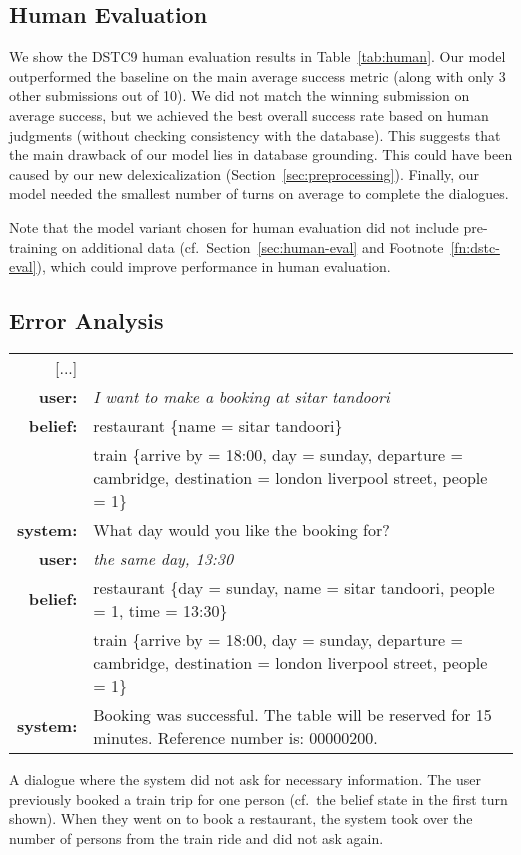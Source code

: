 \documentclass[11pt]{article}
\begin{document}
\subsection{Human Evaluation}

We show the DSTC9 human evaluation results in Table~\ref{tab:human}.
Our model outperformed the baseline on the main average success metric (along with only 3 other submissions out of 10).
We did not match the winning submission on average success, but we achieved the best overall success rate based on human judgments (without checking consistency with the database).
This suggests that the main drawback of our model lies in database grounding.
This could have been caused by our new delexicalization (Section~\ref{sec:preprocessing}).
Finally, our model needed the smallest number of turns on average to complete the dialogues.

Note that the model variant chosen for human evaluation did not include pre-training on additional data (cf.~Section~\ref{sec:human-eval} and Footnote~\ref{fn:dstc-eval}), which could improve performance in human evaluation.

\subsection{Error Analysis}\label{sec:quality-analysis}

\begin{example}[t]
\small
\setlength{\tabcolsep}{2pt}
\begin{mdframed}[style=ExampleFrame]
\begin{tabularx}{\textwidth}{rX}
[...] \\
\bf user: & \it I want to make a booking at sitar tandoori \\
\bf belief: & restaurant \{name = sitar tandoori\} \\
& train \{arrive by = 18:00, day = sunday, departure = cambridge, destination = london liverpool street, people = 1\} \\
\bf system: & What day would you like the booking for? \\
\bf user: & \it the same day, 13:30 \\
\bf belief: & restaurant \{day = sunday, name = sitar tandoori, people = 1, time = 13:30\} \\
& train \{arrive by = 18:00, day = sunday, departure = cambridge, destination = london liverpool street, people = 1\} \\
\bf system: & Booking was successful. The table will be reserved for 15 minutes. Reference number is: 00000200. \\
\end{tabularx}
\end{mdframed}
\caption{A dialogue where the system did not ask for necessary information. The user previously booked a train trip for one person (cf.~the belief state in the first turn shown). When they went on to book a restaurant, the system took over the number of persons from the train ride and did not ask again.\label{ex:error1}}
\end{example}
\end{document}
